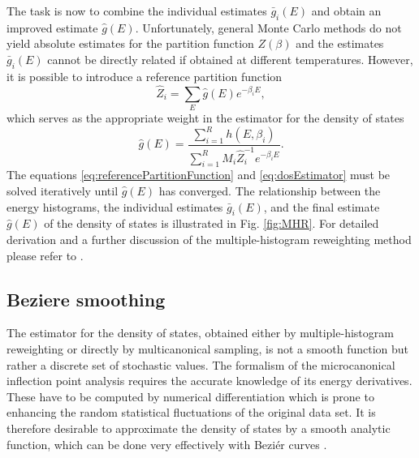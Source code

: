 \documentclass[12pt]{report}
\begin{document}
The task is now to combine the individual estimates $\bar{g}_{i}(E)$ and obtain an improved estimate $\hat{g}(E)$. Unfortunately, general Monte Carlo methods do not yield absolute estimates for the partition function $Z(\beta)$ and the estimates $\bar{g}_{i}(E)$ cannot be directly related if obtained at different temperatures.
However, it is possible to introduce a reference partition function
%
\begin{equation}
\label{eq:referencePartitionFunction}
\hat{Z}_i = \sum_E \hat{g}(E) e^{-\beta_i E},
\end{equation}
%
which serves as the appropriate weight in the estimator for the density of states
\begin{equation}
\label{eq:dosEstimator}
\hat{g}(E)= \frac{\sum_{i=1}^{R} h(E,\beta _{i})}{\sum_{i=1}^{R} M_i
\hat{Z}_i^{-1} e^{-\beta_i E}}.
\end{equation}
%
The equations \ref{eq:referencePartitionFunction} and \ref{eq:dosEstimator} must be solved iteratively until $\hat{g}(E)$ has converged. The relationship between the energy histograms, the individual estimates $\bar{g}_{i}(E)$, and the final estimate $\hat{g}(E)$ of the density of states is illustrated in Fig. \ref{fig:MHR}. For  detailed derivation and a further discussion of the multiple-histogram reweighting method please refer to \cite{Ferrenberg1989,Kumar1992}.

\subsection{Beziere smoothing}
The estimator for the density of states, obtained either by multiple-histogram reweighting or directly by multicanonical sampling, is not a smooth function but rather a discrete set of stochastic values. The formalism of the microcanonical inflection point analysis requires the accurate knowledge of its energy derivatives. These have to be computed by numerical differentiation which is prone to enhancing the random statistical fluctuations of the original data set. It is therefore desirable to approximate the density of states by a smooth analytic function, which can be done very effectively with Bezi\'{e}r curves \cite{Bachmann2014, Bezier1968}.
\end{document}
